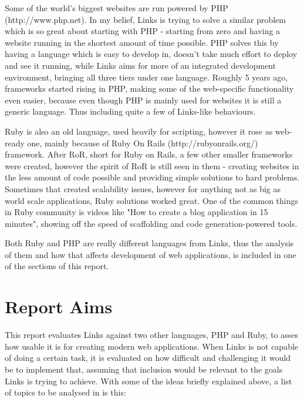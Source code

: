 Some of the world's biggest websites are run powered by PHP (http://www.php.net). In my belief, Links is trying to solve a similar problem which is so great about starting with PHP - starting from zero and having a website running in the shortest amount of time possible. PHP solves this by having a language which is easy to develop in, doesn't take much effort to deploy and see it running, while Links aims for more of an integrated development environment, bringing all three tiers\citep{three-tier} under one language. Roughly 5 years ago, frameworks started rising in PHP, making some of the web-specific functionality even easier, because even though PHP is mainly used for websites it is still a generic language. Thus including quite a few of Links-like behaviours. 

Ruby is also an old language, used heavily for scripting, however it rose as web-ready one, mainly because of Ruby On Rails (http://rubyonrails.org/) framework. After RoR, short for Ruby on Rails, a few other smaller frameworks were created, however the spirit of RoR is still seen in them - creating websites in the less amount of code possible and providing simple solutions to hard problems. Sometimes that created scalability issues\citep{twitter-ror}, however for anything not as big as world scale applications, Ruby solutions worked great. One of the common things in Ruby community is videos like "How to create a blog application in 15 minutes"\citep{ror-blog}, showing off the speed of scaffolding and code generation-powered tools. 

Both Ruby and PHP are really different languages from Links, thus the analysis of them and how that affects development of web applications, is included in one of the sections of this report. 

\section{Report Aims}

This report evaluates Links against two other languages, PHP and Ruby, to asses how usable it is for creating modern web applications. When Links is not capable of doing a certain task, it is evaluated on how difficult and challenging it would be to implement that, assuming that inclusion would be relevant to the goals Links is trying to achieve. With some of the ideas briefly explained above, a list of topics to be analysed in is this:

